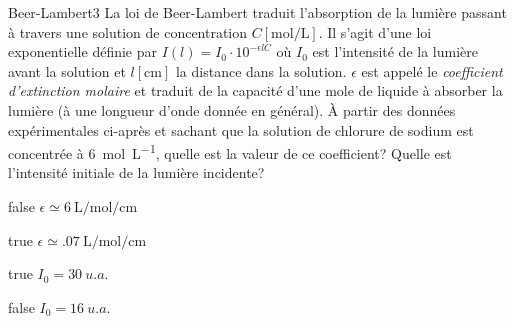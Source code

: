 		\begin{question}{27}{Beer-Lambert}{3}{}
            La loi de Beer-Lambert traduit l'absorption de la lumière passant à travers une solution de concentration $C[\si{\mole\per\liter}]$. Il s'agit d'une loi exponentielle définie par $I(l) = I_0\cdot 10^{-\epsilon l C}$ où $I_0$ est l'intensité de la lumière avant la solution et  $l[\si{\centi\meter}]$ la distance dans la solution. $\epsilon$ est appelé le \emph{coefficient d'extinction molaire} et traduit de la capacité d'une mole de liquide à absorber la lumière (à une longueur d'onde donnée en général). À partir des données expérimentales ci-après et sachant que la solution de chlorure de sodium est concentrée à \SI{6}{\mole\per\liter}, quelle est la valeur de ce coefficient? Quelle est l'intensité initiale de la lumière incidente?
        \begin{figure}
             \end{figure}
        \end{question}
        \begin{reponses}
            \item[false] $\epsilon \simeq \SI{6}{\liter\per\mole\per\centi\meter}$
		    \item[true] $\epsilon \simeq \SI{.07}{\liter\per\mole\per\centi\meter}$
		    \item[true] $I_0 = \SI{30}{{u.a.}}$
		    \item[false] $I_0 = \SI{16}{{u.a.}}$
	    \end{reponses}
